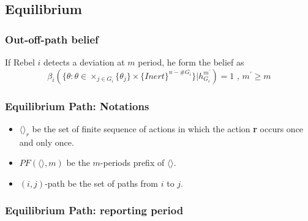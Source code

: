\documentclass[12pt,letter]{article}
\theoremstyle{definition}
\theoremstyle{remark}
\theoremstyle{claim}
\begin{document}
\subsection{Equilibrium}
\label{Apn_equilibrium}
\subsubsection{Out-off-path belief}

If Rebel $i$ detects a deviation at $m$ period, he form the belief as
\begin{equation}
\beta_{i}(\{\theta:\theta\in \times_{j\in G_i}\{\theta_j\}\times\{Inert\}^{n-\#G_i}\}|h^{m^{'}}_{G_i})=1 \text{ , } m^{'}\geq m
\end{equation}



\subsubsection{Equilibrium Path: Notations}


\begin{itemize}

\item $\langle \rangle_r$ be the set of finite sequence of actions in which the action \textbf{r} occurs once and only once.
\item $PF(\langle \rangle,m)$ be the $m$-periods prefix of $\langle \rangle$.
\item $(i,j)$-path be the set of paths from $i$ to $j$.

\end{itemize}

\subsubsection{Equilibrium Path: reporting period}
\end{document}
